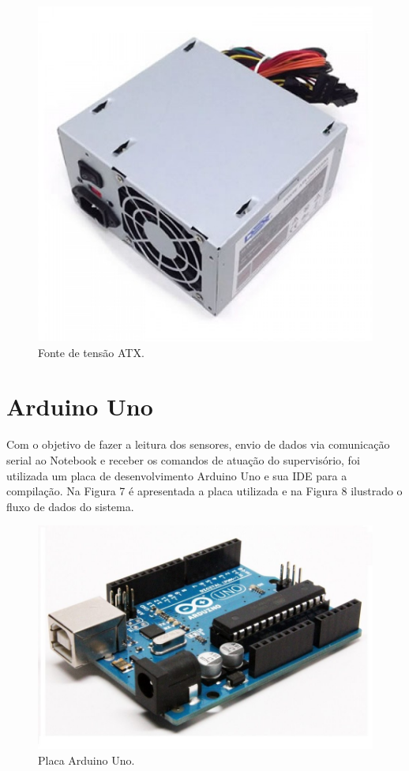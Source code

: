\begin{figure}[htb]
	\caption{\label{FonteAlimentacao}Fonte de tensão ATX.}
	\begin{center}
	    \includegraphics[width=0.45\linewidth]{./img/fonteATX.jpg}
	\end{center}
\end{figure}

		\section{Arduino Uno}
Com o objetivo de fazer a leitura dos sensores, envio de dados via comunicação serial ao Notebook e receber os comandos de atuação
do supervisório, foi utilizada um placa de desenvolvimento Arduino Uno e sua IDE para a compilação. Na Figura 7 é apresentada a placa utilizada e na Figura 8 ilustrado o fluxo de dados do sistema.

\begin{figure}[htb]
	\caption{\label{ArduinoUno}Placa Arduino Uno.}
	\begin{center}
	    \includegraphics[width=0.45\linewidth]{./img/ArduinoUno.jpg}
	\end{center}
\end{figure}


